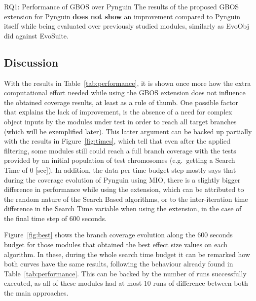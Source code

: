 \documentclass[%
  chapterprefix=false,%
  open=right,%
  twoside=true,%
  paper=a4,%
  logofile={Figures/logo.png},%
  thesistype=master,%
  UKenglish,%
]{se2thesis}
\begin{document}
\begin{table}[t]
  \centering
  
\caption{Amount of modules used while analysing each experimental configuration  for the answering of Research Question 1.}\label{tab:modrq1}
\end{table}


\begin{summary}{RQ1: Performance of GBOS over Pynguin}
  The results of the proposed GBOS extension for Pynguin \textbf{does not show} an improvement compared to Pynguin itself while being evaluated over previously studied modules, similarly as EvoObj did against EvoSuite. 
\end{summary}

\newpage

\subsection*{Discussion}

With the results in Table~\ref{tab:performance}, it is shown once more how the extra computational effort needed while using the GBOS extension does not influence the obtained coverage results, at least as a rule of thumb.
One possible factor that explains the lack of improvement, is the absence of a need for complex object inputs by the modules under test in order to reach all target branches (which will be exemplified later).
This latter argument can be backed up partially with the results in Figure~\ref{fig:times}, which tell that even after the applied filtering, some modules still could reach a full branch coverage with the tests provided by an initial population of test chromosomes (e.g.~getting a Search Time of 0 [sec]).
In addition, the data per time budget step mostly says that during the coverage evolution of Pynguin using MIO, there is a slightly bigger difference in performance while using the extension, which can be attributed to the random nature of the Search Based algorithms, or to the inter-iteration time difference in the Search Time variable when using the extension, in the case of the final time step of 600 seconds.

Figure~\ref{fig:best} shows the branch coverage evolution along the 600 seconds budget for those modules that obtained the best effect size values on each algorithm.
In these, during the whole search time budget it can be remarked how both curves have the same results, following the behaviour already found in Table~\ref{tab:performance}.
This can be backed by the number of runs successfully executed, as all of these modules had at most 10 runs of difference between both the main approaches.
\end{document}
